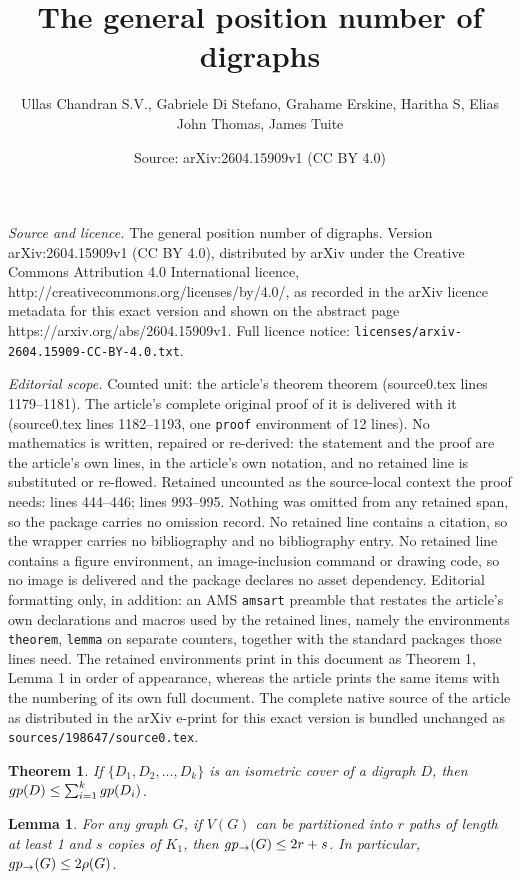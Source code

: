 \documentclass[10pt,a4paper]{amsart}
\title{The general position number of digraphs}
\author{Ullas Chandran S.V., Gabriele Di Stefano, Grahame Erskine, Haritha S, Elias John Thomas, James Tuite}
\date{Source: arXiv:2604.15909v1 (CC BY 4.0)}
\newtheorem{theorem}{Theorem}
\newtheorem{lemma}{Lemma}
\newcommand{\gp}{{\rm gp}}
\newcommand{\lgp}{{\rm gp_{\rightarrow }}}
\begin{document}
\maketitle

\noindent\emph{Source and licence.} The general position number of digraphs. Version arXiv:2604.15909v1 (CC BY 4.0), distributed by arXiv under the Creative Commons Attribution 4.0 International licence, http://creativecommons.org/licenses/by/4.0/, as recorded in the arXiv licence metadata for this exact version and shown on the abstract page https://arxiv.org/abs/2604.15909v1. Full licence notice: \texttt{licenses/arxiv-2604.15909-CC-BY-4.0.txt}.\par\smallskip

\noindent\textit{Editorial scope.} Counted unit: the article's theorem theorem (source0.tex lines 1179--1181). The article's complete original proof of it is delivered with it (source0.tex lines 1182--1193, one \texttt{proof} environment of 12 lines). No mathematics is written, repaired or re-derived: the statement and the proof are the article's own lines, in the article's own notation, and no retained line is substituted or re-flowed.  Retained uncounted as the source-local context the proof needs: lines 444--446; lines 993--995.  Nothing was omitted from any retained span, so the package carries no omission record.  No retained line contains a citation, so the wrapper carries no bibliography and no bibliography entry.  No retained line contains a figure environment, an image-inclusion command or drawing code, so no image is delivered and the package declares no asset dependency.  Editorial formatting only, in addition: an AMS \texttt{amsart} preamble that restates the article's own declarations and macros used by the retained lines, namely the environments \texttt{theorem}, \texttt{lemma} on separate counters, together with the standard packages those lines need.  The retained environments print in this document as Theorem 1, Lemma 1 in order of appearance, whereas the article prints the same items with the numbering of its own full document.  The complete native source of the article as distributed in the arXiv e-print for this exact version is bundled unchanged as \texttt{sources/198647/source0.tex}.
	\begin{theorem}\label{thm:isometric cover}
		If $\{ D_1,D_2,\dots,D_k\}$ is an isometric cover of a digraph $D$, then $\gp(D) \leq \sum_{i=1}^{k} \gp (D_i)$.
	\end{theorem}

	\begin{lemma}\label{lem:path cover bound}
		For any graph $G$, if $V(G)$ can be partitioned into $r$ paths of length at least 1 and $s$ copies of $K_1$, then $\lgp (G) \leq 2r+s$. In particular, $\lgp (G) \leq 2\rho (G)$.
	\end{lemma}
\end{document}
